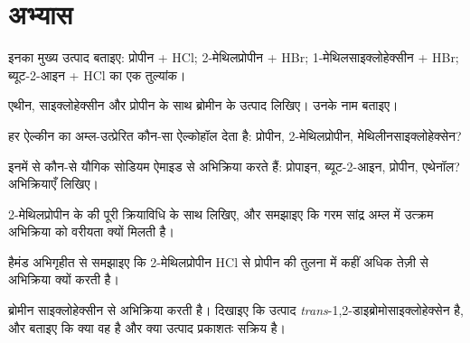 \section{अभ्यास}

\begin{exercise}[$\star$]\label{exo:b1:electrophilic-additions:1}
इनका मुख्य उत्पाद बताइए: प्रोपीन + HCl; 2-मेथिलप्रोपीन + HBr;
1-मेथिलसाइक्लोहेक्सीन + HBr; ब्यूट-2-आइन + HCl का एक तुल्यांक।
\end{exercise}

\begin{exercise}[$\star$]\label{exo:b1:electrophilic-additions:2}
एथीन, साइक्लोहेक्सीन और प्रोपीन के साथ ब्रोमीन के उत्पाद लिखिए। उनके नाम
बताइए।
\end{exercise}

\begin{exercise}[$\star$]\label{exo:b1:electrophilic-additions:3}
हर ऐल्कीन का अम्ल-उत्प्रेरित  कौन-सा ऐल्कोहॉल देता है:
प्रोपीन, 2-मेथिलप्रोपीन, मेथिलीनसाइक्लोहेक्सेन?
\end{exercise}

\begin{exercise}[$\star$]\label{exo:b1:electrophilic-additions:4}
इनमें से कौन-से यौगिक सोडियम ऐमाइड से अभिक्रिया करते हैं: प्रोपाइन, ब्यूट-2-आइन,
प्रोपीन, एथेनॉल? अभिक्रियाएँ लिखिए।
\end{exercise}

\begin{exercise}[$\star\star$]\label{exo:b1:electrophilic-additions:5}
2-मेथिलप्रोपीन के  की पूरी क्रियाविधि  के साथ लिखिए, और समझाइए कि गरम सांद्र अम्ल में उत्क्रम अभिक्रिया को
वरीयता क्यों मिलती है।
\end{exercise}

\begin{exercise}[$\star\star$]\label{exo:b1:electrophilic-additions:6}
हैमंड अभिगृहीत से समझाइए कि 2-मेथिलप्रोपीन HCl से प्रोपीन की तुलना में
कहीं अधिक तेज़ी से अभिक्रिया क्यों करती है।
\end{exercise}

\begin{exercise}[$\star\star$]\label{exo:b1:electrophilic-additions:7}
ब्रोमीन साइक्लोहेक्सीन से अभिक्रिया करती है। दिखाइए कि उत्पाद
\textit{trans}-1,2-डाइब्रोमोसाइक्लोहेक्सेन है, और बताइए कि क्या वह  है और
क्या उत्पाद प्रकाशतः सक्रिय है।
\end{exercise}


